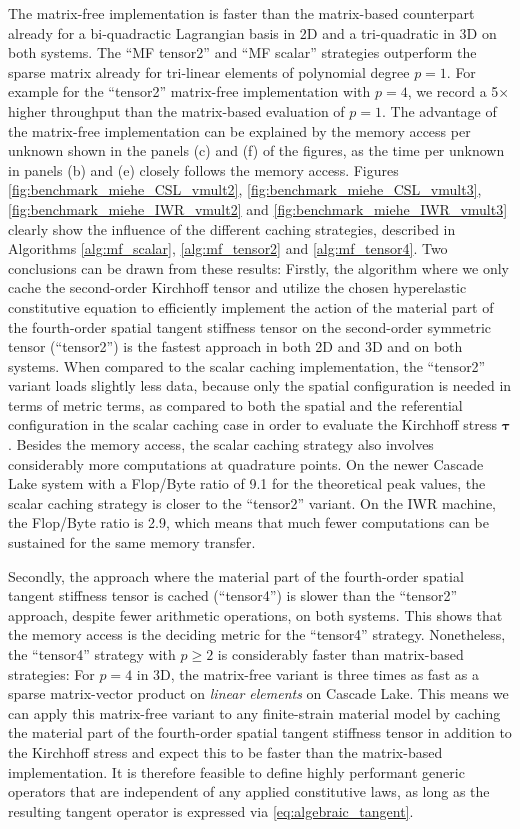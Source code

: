 \documentclass[AMA,STIX1COL]{WileyNJD-v2}
\newcommand*{\gz}[1]{\boldsymbol{#1}}
\begin{document}
The matrix-free implementation is faster than the matrix-based counterpart already for a bi-quadractic Lagrangian basis in 2D and a tri-quadratic in 3D on both systems.
{\color{red}
The ``MF tensor2'' and ``MF scalar'' strategies outperform the sparse matrix already for tri-linear elements of polynomial degree $p=1$. For example for the ``tensor2'' matrix-free implementation with $p=4$, we record a 5$\times$ higher throughput than the matrix-based evaluation of $p=1$. The advantage of the matrix-free implementation can be explained by the memory access per unknown shown in the panels (c) and (f) of the figures, as the time per unknown in panels (b) and (e) closely follows the memory access.
}
Figures \ref{fig:benchmark_miehe_CSL_vmult2}, \ref{fig:benchmark_miehe_CSL_vmult3}, \ref{fig:benchmark_miehe_IWR_vmult2} and \ref{fig:benchmark_miehe_IWR_vmult3} clearly show the influence of the different caching strategies,
described in Algorithms \ref{alg:mf_scalar}, \ref{alg:mf_tensor2} and \ref{alg:mf_tensor4}.
Two conclusions can be drawn from these results:
{\color{red}
Firstly, the algorithm where we only cache the second-order Kirchhoff tensor and utilize the chosen hyperelastic constitutive equation to efficiently implement the action of the material part of the fourth-order spatial tangent stiffness tensor on the second-order symmetric tensor (``tensor2'') is the fastest approach in both 2D and 3D and on both systems. When compared to the scalar caching implementation, the ``tensor2'' variant loads slightly less data, because only the spatial configuration is needed in terms of metric terms, as compared to both the spatial and the referential configuration in the scalar caching case in order to evaluate the Kirchhoff stress $\gz \tau$. Besides the memory access, the scalar caching strategy also involves considerably more computations at quadrature points. On the newer Cascade Lake system with a Flop/Byte ratio of 9.1 for the theoretical peak values, the scalar caching strategy is closer to the ``tensor2'' variant. On the IWR machine, the Flop/Byte ratio is 2.9, which means that much fewer computations can be sustained for the same memory transfer.
}

{\color{red}
Secondly, the approach where the material part of the fourth-order spatial tangent stiffness tensor is cached (``tensor4'') is slower than the ``tensor2'' approach, despite fewer arithmetic operations, on both systems. This shows that the memory access is the deciding metric for the ``tensor4'' strategy.
Nonetheless, the ``tensor4'' strategy with $p\geq 2$ is considerably faster than matrix-based strategies: For $p=4$ in 3D, the matrix-free variant is three times as fast as a sparse matrix-vector product on \emph{linear elements} on Cascade Lake. This means we can apply this matrix-free variant to any finite-strain material model by caching the material part of the fourth-order spatial tangent stiffness tensor in addition to the Kirchhoff stress and expect this to be faster than the matrix-based implementation.
}
It is therefore feasible to define highly performant generic operators that are independent of any applied constitutive laws,
as long as the resulting tangent operator is expressed via \eqref{eq:algebraic_tangent}.
\end{document}

